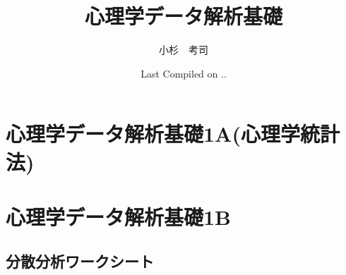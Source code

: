 \documentclass[dvipsnames]{ltjsbook}
\begin{document}

\VerbatimFootnotes
\title{心理学データ解析基礎}
\author{小杉　考司}
\date{Last Compiled on \number\year .\number\month .\number\day}
\maketitle
\setcounter{tocdepth}{1}



\tableofcontents

\linenumbers
\part{心理学データ解析基礎1A(心理学統計法)}















\part{心理学データ解析基礎1B}
















\appendix

\chapter{分散分析ワークシート}\label{app_anova_worksheet}
% 

\nolinenumbers

\printbibliography[title=引用文献]
\printindex

\printindex[ridx]
\end{document}
